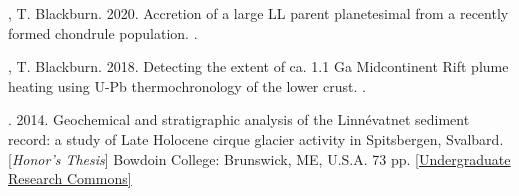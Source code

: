 \begin{etaremune} [itemsep=4pt, leftmargin=3ex]
    \item \ghedwards, T. Blackburn. 2020. Accretion of a large LL parent planetesimal from a recently formed chondrule population. . 
    \item \ghedwards, T. Blackburn. 2018. Detecting the extent of ca. 1.1 Ga Midcontinent Rift plume heating using U-Pb thermochronology of the lower crust. .  
    \item \ghedwards. 2014. Geochemical and stratigraphic analysis of the Linnévatnet sediment record: a study of Late Holocene cirque glacier activity in Spitsbergen, Svalbard. [\textit{Honor’s Thesis}] Bowdoin College: Brunswick, ME, U.S.A. 73 pp. \href{https://digitalcommons.bowdoin.edu/honorsprojects/12/}{[Undergraduate Research Commons]}
\end{etaremune}